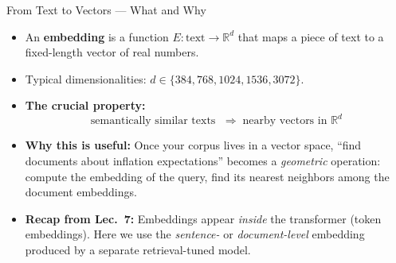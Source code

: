 \begin{frame}{From Text to Vectors --- What and Why}
\begin{itemize}
\item An \textbf{embedding} is a function $E: \text{text} \to \mathbb{R}^d$ that maps a piece of text to a fixed-length vector of real numbers.

\medskip
\item Typical dimensionalities: $d \in \{384, 768, 1024, 1536, 3072\}$.

\medskip
\item \textbf{The crucial property:}
\[
\text{semantically similar texts } \;\Longrightarrow\; \text{nearby vectors in } \mathbb{R}^d
\]

\medskip
\item \textbf{Why this is useful:} Once your corpus lives in a vector space, ``find documents about inflation expectations'' becomes a \emph{geometric} operation: compute the embedding of the query, find its nearest neighbors among the document embeddings.

\medskip
\item \textbf{Recap from Lec.\ 7:} Embeddings appear \emph{inside} the transformer (token embeddings). Here we use the \emph{sentence-} or \emph{document-level} embedding produced by a separate retrieval-tuned model.
\end{itemize}
\end{frame}

